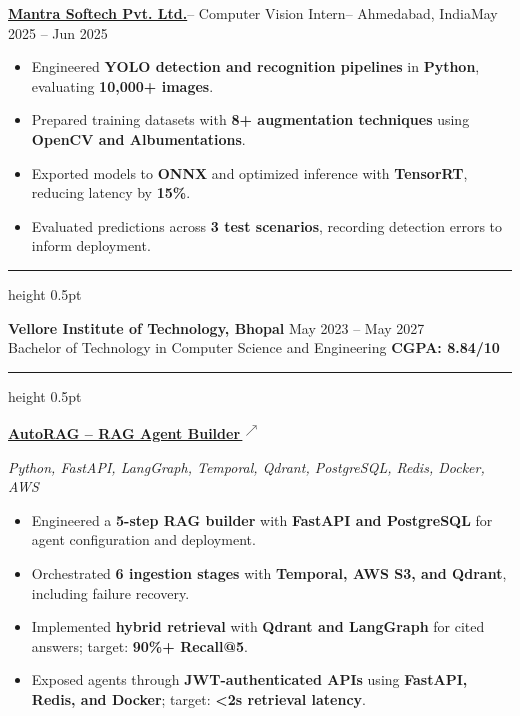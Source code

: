 \documentclass[a4paper,10pt]{extarticle}
\newcommand{\ressection}[1]{%
    \par\vspace{3pt}
    \noindent{\fontsize{10.4}{11.4}\selectfont
    \bfseries\MakeUppercase{#1}}\par
    \vspace{1pt}
    \hrule height 0.5pt
    \vspace{2pt}
}
\newcommand{\job}[4]{%
    \par\vspace{1pt}\noindent
    \textbf{#1}\enspace--\enspace
    #2\enspace--\enspace
    #3\hfill #4\par
}
\newcommand{\project}[4]{%
    \par\vspace{1pt}\noindent
    \href{#4}{\textbf{#1}\,\textsuperscript{\(\nearrow\)}}%
    \hfill{\small #2}\par
    {\fontsize{9}{9.8}\selectfont\itshape #3\par}
}
\begin{document}
\job{\href{https://www.mantratec.com/}{Mantra Softech Pvt. Ltd.}}
{Computer Vision Intern}
{Ahmedabad, India}
{May 2025 -- Jun 2025}

\begin{itemize}
    \item Engineered \textbf{YOLO detection and recognition pipelines} in \textbf{Python}, evaluating
    \textbf{10,000+ images}.

    \item Prepared training datasets with \textbf{8+ augmentation techniques}
    using \textbf{OpenCV and Albumentations}.

    \item Exported models to \textbf{ONNX} and optimized inference
    with \textbf{TensorRT}, reducing latency by \textbf{15\%}.

    \item Evaluated predictions across \textbf{3 test scenarios},
    recording detection errors to inform deployment.
\end{itemize}

\ressection{Education}

\textbf{Vellore Institute of Technology, Bhopal}
\hfill May 2023 -- May 2027\\
Bachelor of Technology in Computer Science and Engineering
\hfill\textbf{CGPA: 8.84/10}

\ressection{Projects}


\project{AutoRAG -- RAG Agent Builder}{}
{Python, FastAPI, LangGraph, Temporal, Qdrant, PostgreSQL, Redis, Docker, AWS}
{https://github.com/RahulAgarwal701/AutoRAG}


\begin{itemize}
    \item Engineered a \textbf{5-step RAG builder} with \textbf{FastAPI and PostgreSQL} for agent configuration and deployment.

    \item Orchestrated \textbf{6 ingestion stages} with \textbf{Temporal, AWS S3, and Qdrant}, including failure recovery.

    \item Implemented \textbf{hybrid retrieval} with \textbf{Qdrant and LangGraph} for cited answers; target: \textbf{90\%+ Recall@5}.

    \item Exposed agents through \textbf{JWT-authenticated APIs} using \textbf{FastAPI, Redis, and Docker}; target: \textbf{<2s retrieval latency}.
\end{itemize}
\end{document}
